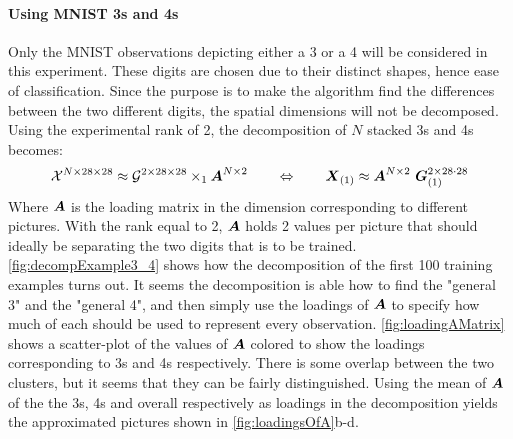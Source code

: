 \paragraph{Using MNIST 3s and 4s}
Only the MNIST observations depicting either a 3 or a 4 will be considered in this experiment. These digits are chosen due to their distinct shapes, hence ease of classification. Since the purpose is to make the algorithm find the differences between the two different digits, the spatial dimensions will not be decomposed. Using the experimental rank of 2, the decomposition of $N$ stacked 3s and 4s becomes:
\begin{equation}
    \tensor{X}^{N\times 28\times 28} \approx \tensor{G}^{2 \times 28 \times 28} \times_1 \bs{A}^{N\times 2} \qquad \Leftrightarrow \qquad \bs{X}_{(1)} \approx \bs{A}^{N\times 2} \ \bs{G}^{2 \times 28\cdot 28}_{(1)}
\end{equation}
Where $\boldsymbol{A}$ is the loading matrix in the dimension corresponding to different pictures. With the rank equal to 2, $\boldsymbol{A}$ holds 2 values per picture that should ideally be separating the two digits that is to be trained. \autoref{fig:decompExample3_4} shows how the decomposition of the first 100 training examples turns out. It seems the decomposition is able how to find the "general 3" and the "general 4", and then simply use the loadings of $\boldsymbol{A}$ to specify how much of each should be used to represent every observation. \autoref{fig:loadingAMatrix} shows a scatter-plot of the values of $\boldsymbol{A}$ colored to show the loadings corresponding to 3s and 4s respectively. There is some overlap between the two clusters, but it seems that they can be fairly distinguished. Using the mean of $\boldsymbol{A}$ of the the 3s, 4s and overall respectively as loadings in the decomposition yields the approximated pictures shown in \autoref{fig:loadingsOfA}b-d.

